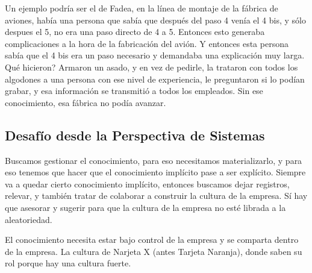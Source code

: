 Un ejemplo podría ser el de Fadea, en la línea de montaje de la fábrica
de aviones, había una persona que sabía que después del paso 4 venía el
4 bis, y sólo despues el 5, no era una paso directo de 4 a 5. Entonces
esto generaba complicaciones a la hora de la fabricación del avión. Y
entonces esta persona sabía que el 4 bis era un paso necesario y
demandaba una explicación muy larga. Qué hicieron? Armaron un asado, y
en vez de pedirle, la trataron con todos los algodones a una persona con
ese nivel de experiencia, le preguntaron si lo podían grabar, y esa
información se transmitió a todos los empleados. Sin ese conocimiento,
esa fábrica no podía avanzar.

\hypertarget{desafuxedo-desde-la-perspectiva-de-sistemas}{%
\subsection{Desafío desde la Perspectiva de
Sistemas}\label{desafuxedo-desde-la-perspectiva-de-sistemas}}

Buscamos gestionar el conocimiento, para eso necesitamos materializarlo,
y para eso tenemos que hacer que el conocimiento implícito pase a ser
explícito. Siempre va a quedar cierto conocimiento implícito, entonces
buscamos dejar registros, relevar, y también tratar de colaborar a
construir la cultura de la empresa. Sí hay que asesorar y sugerir para
que la cultura de la empresa no esté librada a la aleatoriedad.

El conocimiento necesita estar bajo control de la empresa y se comparta
dentro de la empresa. La cultura de Narjeta X (antes Tarjeta Naranja), donde saben su rol
porque hay una cultura fuerte.

\onecolumn
